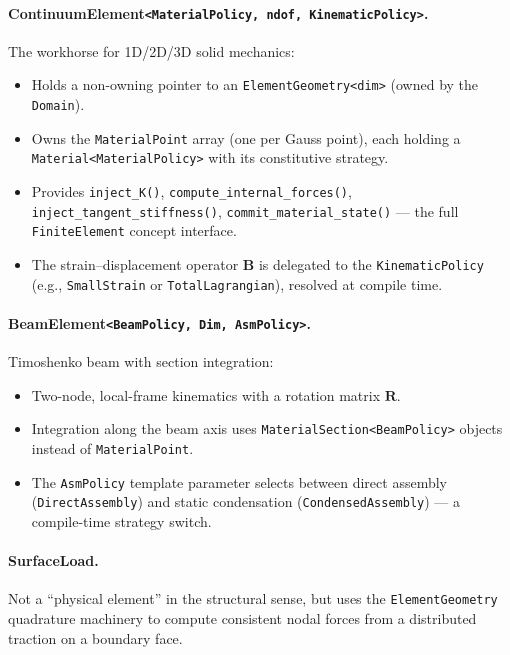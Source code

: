\paragraph{ContinuumElement\texttt{<MaterialPolicy, ndof, KinematicPolicy>}.}
The workhorse for 1D/2D/3D solid mechanics:
\begin{itemize}[nosep]
  \item Holds a non-owning pointer to an \texttt{ElementGeometry<dim>} (owned
        by the \texttt{Domain}).
  \item Owns the \texttt{MaterialPoint} array (one per Gauss point), each
        holding a \texttt{Material<MaterialPolicy>} with its constitutive
        strategy.
  \item Provides \texttt{inject\_K()}, \texttt{compute\_internal\_forces()},
        \texttt{inject\_tangent\_stiffness()}, \texttt{commit\_material\_state()}
        --- the full \texttt{FiniteElement} concept interface.
  \item The strain--displacement operator $\mathbf{B}$ is delegated to the
        \texttt{KinematicPolicy} (e.g., \texttt{SmallStrain} or
        \texttt{TotalLagrangian}), resolved at compile time.
\end{itemize}

\paragraph{BeamElement\texttt{<BeamPolicy, Dim, AsmPolicy>}.}
Timoshenko beam with section integration:
\begin{itemize}[nosep]
  \item Two-node, local-frame kinematics with a rotation matrix $\mathbf{R}$.
  \item Integration along the beam axis uses
        \texttt{MaterialSection<BeamPolicy>} objects instead of
        \texttt{MaterialPoint}.
  \item The \texttt{AsmPolicy} template parameter selects between direct
        assembly (\texttt{DirectAssembly}) and static condensation
        (\texttt{CondensedAssembly}) --- a compile-time strategy switch.
\end{itemize}

\paragraph{SurfaceLoad.}
Not a ``physical element'' in the structural sense, but uses the
\texttt{ElementGeometry} quadrature machinery to compute consistent nodal
forces from a distributed traction on a boundary face.



